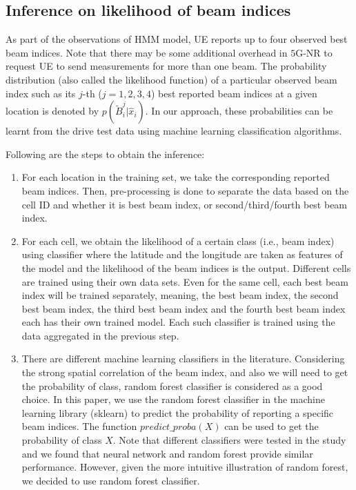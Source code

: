 \documentclass[conference, 10pt]{IEEEtran}
\begin{document}
\begin{NoHyper}
\subsection{Inference on likelihood of beam indices}
\label{sec:prob-classification}
As part of the observations of HMM model, UE reports up to four observed best beam indices. Note that there may be some additional overhead in $5$G-NR to request UE to send measurements for more than one beam. The probability
distribution (also called the likelihood function) of a particular observed beam index such as its $j$-th ($j=1, 2, 3, 4$) best reported beam indices
at a given location is denoted by
$p(\tilde{B}^j_i|\hat{x}_{i})$. In our approach, these probabilities
can be learnt from the drive test data using machine learning classification algorithms.

Following are the steps to obtain the inference:

\begin{enumerate}

\item For each location in the training set, we
take the corresponding reported beam indices. Then, pre-processing is done to separate the data based on the cell ID and whether it is best beam index, or second/third/fourth best beam index.

\item For each cell, we obtain the likelihood of a certain class (i.e., beam index) using classifier where the latitude and the longitude are 
taken as features of the model and the likelihood of the beam indices is the output. Different cells are trained using their own data sets. Even for the same
cell, each best beam index will be trained separately, meaning, the best beam index, the second best beam index, the third best beam index and the fourth best beam index each has their own trained model.
Each such classifier is trained using the data aggregated in the previous step.

\item There are different machine learning classifiers in the literature. Considering the strong spatial correlation of the beam index, and also we will need to get the probability of class, random forest classifier is considered as a good choice. 
In this paper, we use the random forest classifier in the machine learning library (sklearn) to predict the probability of 
reporting a specific beam indices. The function $predict\_proba(X)$ can be used to get the probability of class $X$. Note that different classifiers were tested in the study and we found that
neural network and random forest provide similar performance. However, given the more intuitive illustration of random forest, we decided to use random forest classifier.
\end{enumerate}

\end{NoHyper}
\end{document}
